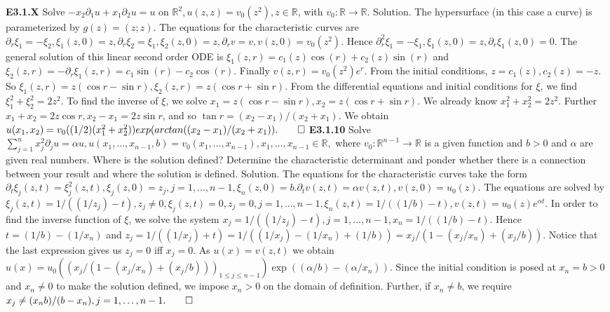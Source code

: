 \documentclass[6pt]{article}
\newcommand{\R}{\mathbb{R}}
\newcommand{\ra}{\rightarrow}
\begin{document}
\begin{multicols}{2}
{\bf E3.1.X} Solve $-x_2\partial_1u+x_1\partial_2u=u$ on $\R^2,  u(z,z)=v_0(z^2), z \in \R$, with $v_0: \R \ra \R$. Solution. The hypersurface (in this case a curve) is parameterized by $g(z)=(z; z)$. The equations for the characteristic curves are $\partial_r \xi_1=-\xi_2, \xi_1(z,0)=z, \partial_r \xi_2=\xi_1, \xi_2(z,0)=z, \partial_r v = v, v(z,0)=v_0(z^2)$. Hence $\partial_r^2\xi_1=-\xi_1,\xi_1(z,0)=z, \partial_r\xi_1(z,0)=0$. The general solution of this linear second order ODE is $\xi_1(z,r)=c_1(z)\cos(r)+c_2(z)\sin(r)$ and $\xi_2(z,r)=-\partial_r\xi_1(z,r)=c_1 \sin(r)-c_2 \cos(r).$  Finally $v(z,r)=v_0(z^2)e^r$.  From the initial conditions, $z = c_1(z), c_2(z)=-z$.  So $\xi_1(z,r)=z(\cos r - \sin r), \xi_2(z,r)=z(\cos r+\sin r)$. From the differential equations and initial conditions for $\xi$, we find $\xi_1^2 + \xi_2^2=2z^2$.  To find the inverse of $\xi$, we solve $x_1=z(\cos r - \sin r), x_2=z(\cos r+\sin r)$.  We already know $x_1^2 + x_2^2=2z^2$. Further $x_1+x_2=2z\cos r, x_2-x_1=2z\sin r$, and so $\tan r=(x_2-x_1)/(x_2+x_1)$. We obtain $u(x_1, x_2)=v_0((1/2)(x_1^2+x_2^2))exp(arctan((x_2-x_1)/(x_2+x_1)). \qed$
{\bf E3.1.10} Solve $\sum_{j=1}^nx_j^2\partial_ju=\alpha u, u(x_1, \dots, x_{n-1},b)=v_0(x_1, \dots, x_{n-1}), x_1, \dots, x_{n-1} \in \R,$ where $v_0: \R^{n-1} \ra \R$ is a given function and $b>0$ and $\alpha$ are given real numbers. Where is the solution defined?  Determine the characteristic determinant and ponder whether there is a connection between your result and where the solution is defined. Solution.  The equations for the characteristic curves take the form $\partial_t\xi_j(z,t)=\xi_j^2(z,t), \xi_j(z,0)=z_j, j=1,\dots, n-1, \xi_n(z,0)=b. \partial_tv(z,t)=\alpha v(z,t), v(z,0)=u_0(z)$. The equations are solved by $\xi_j(z,t)=1/((1/z_j)-t), z_j \neq 0, \xi_j(z,t)=0, z_j=0, j=1,\dots, n-1, \xi_n(z,t)=1/((1/b)-t), v(z,t)=u_0(z)e^{\alpha t}$. In order to find the inverse function of $\xi$, we solve the system $x_j=1/((1/z_j)-t), j=1,\dots, n-1, x_n=1/((1/b)-t)$. Hence $t = (1/b)-(1/x_n)$ and $z_j=1/((1/x_j)+t)=1/((1/x_j)-(1/x_n)+(1/b))=x_j/(1-(x_j/x_n)+(x_j/b))$. Notice that the last expression gives us $z_j=0$ iff $x_j=0$. As $u(x)=v(z,t)$ we obtain $u(x)=u_0((x_j/(1-(x_j/x_n)+(x_j/b)))_{1\leq j\leq n-1})\exp ((\alpha/b)-(\alpha/x_n))$.  Since the initial condition is posed at $x_n=b>0$ and $x_n \neq 0$ to make the solution defined, we impose $x_n>0$ on the domain of definition.  Further, if $x_n \neq b$, we require $x_j \neq (x_nb)/(b-x_n), j=1, \dots, n-1. \qed$

\end{multicols}
\end{document}
